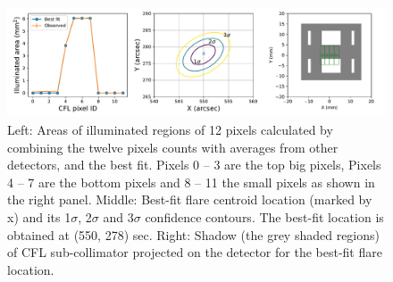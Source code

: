 \documentclass{aa}
\begin{document}
\begin{figure}
  \centering
  \includegraphics[width=0.95\linewidth]{figures/cflMay07.pdf}
  \caption{
   Left: Areas of illuminated regions of 12 pixels calculated by combining
  the twelve pixels counts with averages from other detectors, and the best fit. 
  Pixels 0 -- 3 are the top big pixels, Pixels 4 -- 7 are the bottom pixels and 8 -- 11 the small pixels as shown in the right panel.
   Middle: Best-fit flare centroid location (marked by x) and its 1$\sigma$, 2$\sigma$ and 3$\sigma$ confidence contours.
   The best-fit location is obtained at (550, 278) sec. 
    Right:  Shadow (the grey shaded regions) of CFL sub-collimator projected on the detector 
  for the best-fit flare location. }
  \label{fig:cfl}
\end{figure}
\end{document}
